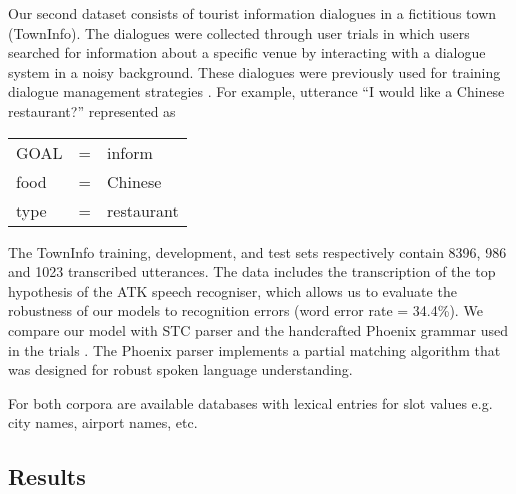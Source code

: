 \documentclass{article}
\begin{document}
Our second dataset consists of tourist information dialogues in a fictitious town (TownInfo). The dialogues were collected through user trials in which users searched for information about a specific venue by interacting with a dialogue system in a noisy background. These dialogues were previously used for training dialogue management strategies \cite{williams07,thomson08}. 
For example, utterance ``I would like a Chinese restaurant?'' represented as

\vspace{.15cm}
\begin{tabular}{lll}
  GOAL       & = & inform \\
  food       & = & Chinese \\
  type       & = & restaurant \\
\end{tabular} 
\vspace{.15cm}

The TownInfo training, development, and test sets respectively contain 8396, 986 and 1023 transcribed utterances.  The data includes the transcription of the top hypothesis of the ATK speech recogniser, which allows us to evaluate the robustness of our models to recognition errors (word error rate = 34.4\%). 
We compare our model with STC parser \cite{mairesse09} and the handcrafted Phoenix grammar \cite{ward91} used in the trials \cite{williams07,thomson08}. The Phoenix parser implements a partial matching algorithm that was designed for robust spoken language understanding.

For both corpora are available databases with lexical entries for slot values e.g. city names, airport names, etc. 

\subsection{Results}
\end{document}
